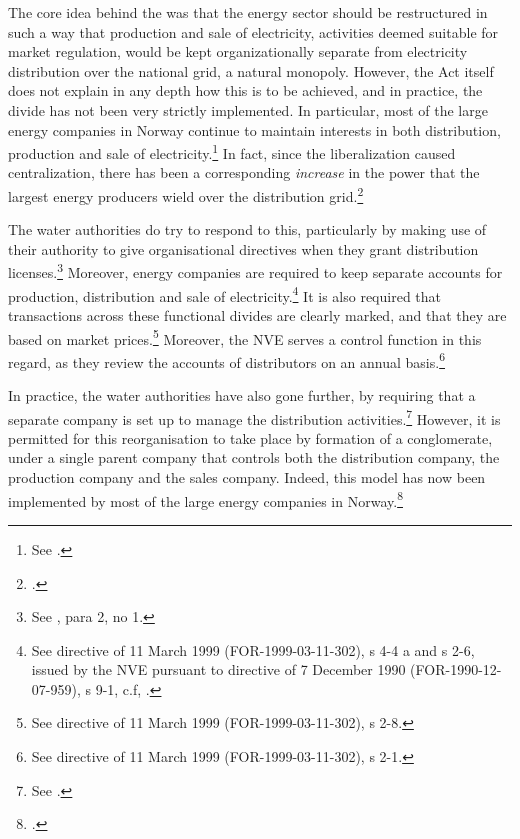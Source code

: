 
The core idea behind the \cite{ea90} was that the energy sector should be restructured in such a way that production and sale of electricity, activities deemed suitable for market regulation, would be kept organizationally separate from electricity distribution over the national grid, a natural monopoly. However, the Act itself does not explain in any depth how this is to be achieved, and in practice, the divide has not been very strictly implemented. In particular, most of the large energy companies in Norway continue to maintain interests in both distribution, production and sale of electricity.\footnote{See \cite{bibow11}.} In fact, since the liberalization caused centralization, there has been a corresponding {\it increase} in the power that the largest energy producers wield over the distribution grid.\footcite{bibow11}

The water authorities do try to respond to this, particularly by making use of their authority to give organisational directives when they grant distribution licenses.\footnote{See \cite[4-1]{ea90}, para 2, no 1.} Moreover, energy companies are required to keep separate accounts for production, distribution and sale of electricity.\footnote{See directive of 11 March 1999 (FOR-1999-03-11-302), s 4-4 a and s 2-6, issued by the NVE pursuant to directive of 7 December 1990 (FOR-1990-12-07-959), s 9-1, c.f, \cite[10-6]{ea90}.} It is also required that transactions across these functional divides are clearly marked, and that they are based on market prices.\footnote{See directive of 11 March 1999 (FOR-1999-03-11-302), s 2-8.} Moreover, the NVE serves a control function in this regard, as they review the accounts of distributors on an annual basis.\footnote{See directive of 11 March 1999 (FOR-1999-03-11-302), s 2-1.}

In practice, the water authorities have also gone further, by requiring that a separate company is set up to manage the distribution activities.\footnote{See \cite{bibow11}.} However, it is permitted for this reorganisation to take place by formation of a conglomerate, under a single parent company that controls both the distribution company, the production company and the sales company. Indeed, this model has now been implemented by most of the large energy companies in Norway.\footcite{bibow11} 

